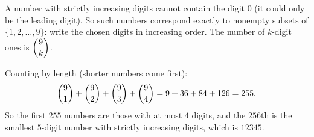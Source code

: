 A number with strictly increasing digits cannot contain the digit $0$ (it could only be the leading digit). So such numbers correspond exactly to nonempty subsets of $\{1,2,\dots,9\}$: write the chosen digits in increasing order. The number of $k$-digit ones is $\dbinom9k$.

Counting by length (shorter numbers come first):
\[
\dbinom91+\dbinom92+\dbinom93+\dbinom94=9+36+84+126=255 .
\]
So the first $255$ numbers are those with at most $4$ digits, and the $256$th is the smallest $5$-digit number with strictly increasing digits, which is $\boxed{12345}$.
